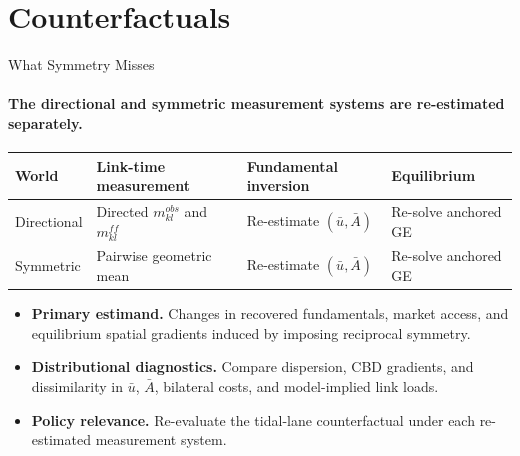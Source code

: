 \documentclass[11pt,aspectratio=169]{beamer}
\begin{document}
\section{Counterfactuals}
\begin{frame}{What Symmetry Misses}
\framesubtitle{The directional and symmetric measurement systems are re-estimated separately.}
\small
\begin{center}
\scriptsize
\begin{tabularx}{0.94\textwidth}{@{}p{}p{}p{}X@{}}
\toprule
World & Link-time measurement & Fundamental inversion & Equilibrium \\
\midrule
Directional & Directed $m_{kl}^{obs}$ and $m_{kl}^{ff}$ & Re-estimate $(\bar u,\bar A)$ & Re-solve anchored GE \\
Symmetric & Pairwise geometric mean & Re-estimate $(\bar u,\bar A)$ & Re-solve anchored GE \\
\bottomrule
\end{tabularx}
\end{center}
\vspace{0.25em}
\begin{itemize}\footnotesize
  \item \textbf{Primary estimand.} Changes in recovered fundamentals, market access, and equilibrium spatial gradients induced by imposing reciprocal symmetry.
  \item \textbf{Distributional diagnostics.} Compare dispersion, CBD gradients, and dissimilarity in $\bar u$, $\bar A$, bilateral costs, and model-implied link loads.
  \item \textbf{Policy relevance.} Re-evaluate the tidal-lane counterfactual under each re-estimated measurement system.
\end{itemize}
\vspace{0.3em}
\begin{center}
\end{center}
\end{frame}
\end{document}
